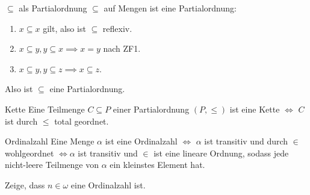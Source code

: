 \documentclass[12pt]{article}
\begin{document}
\begin{example}{$\subseteq$ als Partialordnung}{}
    $\subseteq$ auf Mengen ist eine Partialordnung:

    \begin{enumerate}
        \item $x \subseteq x$ gilt, also ist $\subseteq$ reflexiv.
        \item $x \subseteq y, y \subseteq x \implies x = y$ nach ZF1.
        \item $x \subseteq y, y \subseteq z \implies x \subseteq z$.
    \end{enumerate}

    Also ist $\subseteq$ eine Partialordnung.
\end{example}

\begin{definition}{Kette}{}
    Eine Teilmenge $C \subseteq P$ einer Partialordnung $(P, \leq)$ ist eine Kette $\iff$ $C$ ist durch $\leq$ total geordnet.
\end{definition}

\begin{definition}{Ordinalzahl}{}
    Eine Menge $\alpha$ ist eine Ordinalzahl $\iff$ $\alpha$ ist transitiv und durch $\in$ wohlgeordnet $\iff \alpha$ ist transitiv und $\in$ ist eine lineare Ordnung, sodass jede nicht-leere Teilmenge von $\alpha$ ein kleinstes Element hat.
\end{definition}

\begin{exercise}{}{}
    Zeige, dass $n \in \omega$ eine Ordinalzahl ist.
\end{exercise}
\end{document}

